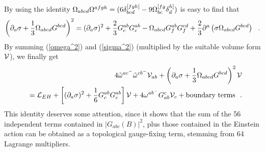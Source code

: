 \documentclass[a4paper,12pt]{article}
\let\pa=\partial
\let\nn=\nonumber
\def\V{{\cal V}}
\begin{document}
By using the identity $\Omega_{abcd}\Omega^{afgh}=(6\delta_{bcd}^{[fgh]}
-9\Omega_{bc}^{[fg}\delta^{h]}_d )$ is easy to find that
\begin{equation}
\left(\pa_a\sigma + {1\over 3}\O_{abcd}G^{bcd}\right)^2 =
(\pa_a\sigma)^2 + {2\over 3}G^{ab}_c G^{ab}_c - 
\O_{abcd}G^{ab}_f G^{cd}_f + 
{2\over 3}\pa^a\left(\sigma\O_{abcd}G^{bcd}\right) \ \ .
\label{sigma^2}
\end{equation}
By summing (\ref{omega^2}) and (\ref{sigma^2})
(multiplied by the suitable volume form $\V$),
we finally get
\begin{eqnarray}
&& 4 \tilde\o^{ac^-}\tilde\o^{cb^-}{\cal V}_{ab} +
\left(\pa_a\sigma + {1\over 3}\O_{abcd}G^{bcd}\right)^2 \V 
\label{fund-id} \\
&&= {\cal L}_{EH} + \left[(\pa_a \sigma)^2 +  
{1\over 6}G^{ab}_c G^{ab}_c\right]\V
+ 4 \o^{ab^-}G_{ab}^c\V_c 
+ \mbox{boundary terms} \ \ .
\nn
\end{eqnarray}
This identity deserves some attention, since it shows 
that the sum of the 56 independent terms contained in $ |G _{abc}(B) |^2$,
plus those contained in the Einstein action can be obtained as a
topological gauge-fixing term, stemming from 64 Lagrange multipliers. 
\end{document}
